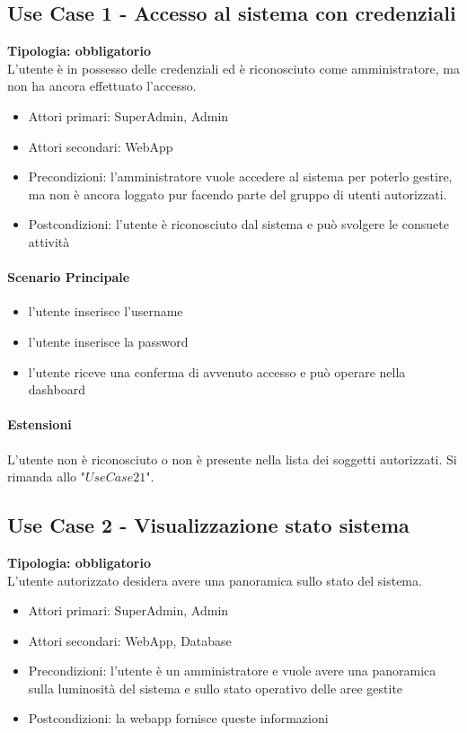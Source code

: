 \documentclass[12pt]{article}
\begin{document}
\subsection{Use Case 1 - Accesso al sistema con credenziali}
\textbf{Tipologia: obbligatorio} \\
L'utente è in possesso delle credenziali ed è riconosciuto come amministratore, ma non ha ancora effettuato l'accesso.
\begin{itemize}
	\item Attori primari: SuperAdmin, Admin
	\item Attori secondari: WebApp
	\item Precondizioni: l'amministratore vuole accedere al sistema per poterlo gestire, ma non è ancora loggato pur facendo parte del gruppo di utenti autorizzati.
	\item Postcondizioni: l'utente è riconosciuto dal sistema e può svolgere le consuete attività
\end{itemize}
\paragraph{Scenario Principale}
\begin{itemize}
	\item l'utente inserisce l'username
	\item l'utente inserisce la password
	\item l'utente riceve una conferma di avvenuto accesso e può operare nella dashboard
\end{itemize}
\paragraph{Estensioni} L'utente non è riconosciuto o non è presente nella lista dei soggetti autorizzati. Si rimanda allo "$Use Case 21 $".

\subsection{Use Case 2 - Visualizzazione stato sistema}
\textbf{Tipologia: obbligatorio} \\
L'utente autorizzato desidera avere una panoramica sullo stato del sistema.
\begin{itemize}
	\item Attori primari: SuperAdmin, Admin
	\item Attori secondari: WebApp, Database
	\item Precondizioni: l'utente è un amministratore e vuole avere una panoramica sulla luminosità del sistema e sullo stato operativo delle aree gestite
	\item Postcondizioni: la webapp fornisce queste informazioni
\end{itemize}
\end{document}
